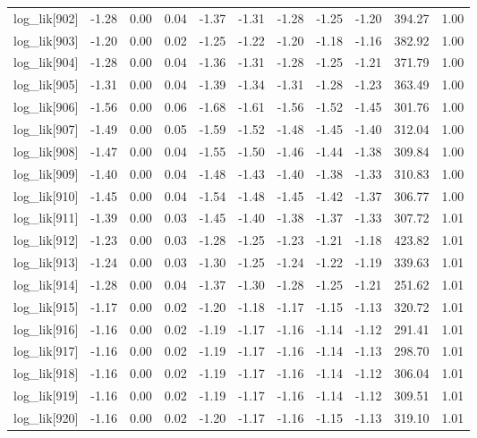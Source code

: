 \begin{table}[ht]
\begin{tabular}{rrrrrrrrrrr}
  log\_lik[902] & -1.28 & 0.00 & 0.04 & -1.37 & -1.31 & -1.28 & -1.25 & -1.20 & 394.27 & 1.00 \\ 
  log\_lik[903] & -1.20 & 0.00 & 0.02 & -1.25 & -1.22 & -1.20 & -1.18 & -1.16 & 382.92 & 1.00 \\ 
  log\_lik[904] & -1.28 & 0.00 & 0.04 & -1.36 & -1.31 & -1.28 & -1.25 & -1.21 & 371.79 & 1.00 \\ 
  log\_lik[905] & -1.31 & 0.00 & 0.04 & -1.39 & -1.34 & -1.31 & -1.28 & -1.23 & 363.49 & 1.00 \\ 
  log\_lik[906] & -1.56 & 0.00 & 0.06 & -1.68 & -1.61 & -1.56 & -1.52 & -1.45 & 301.76 & 1.00 \\ 
  log\_lik[907] & -1.49 & 0.00 & 0.05 & -1.59 & -1.52 & -1.48 & -1.45 & -1.40 & 312.04 & 1.00 \\ 
  log\_lik[908] & -1.47 & 0.00 & 0.04 & -1.55 & -1.50 & -1.46 & -1.44 & -1.38 & 309.84 & 1.00 \\ 
  log\_lik[909] & -1.40 & 0.00 & 0.04 & -1.48 & -1.43 & -1.40 & -1.38 & -1.33 & 310.83 & 1.00 \\ 
  log\_lik[910] & -1.45 & 0.00 & 0.04 & -1.54 & -1.48 & -1.45 & -1.42 & -1.37 & 306.77 & 1.00 \\ 
  log\_lik[911] & -1.39 & 0.00 & 0.03 & -1.45 & -1.40 & -1.38 & -1.37 & -1.33 & 307.72 & 1.01 \\ 
  log\_lik[912] & -1.23 & 0.00 & 0.03 & -1.28 & -1.25 & -1.23 & -1.21 & -1.18 & 423.82 & 1.01 \\ 
  log\_lik[913] & -1.24 & 0.00 & 0.03 & -1.30 & -1.25 & -1.24 & -1.22 & -1.19 & 339.63 & 1.01 \\ 
  log\_lik[914] & -1.28 & 0.00 & 0.04 & -1.37 & -1.30 & -1.28 & -1.25 & -1.21 & 251.62 & 1.01 \\ 
  log\_lik[915] & -1.17 & 0.00 & 0.02 & -1.20 & -1.18 & -1.17 & -1.15 & -1.13 & 320.72 & 1.01 \\ 
  log\_lik[916] & -1.16 & 0.00 & 0.02 & -1.19 & -1.17 & -1.16 & -1.14 & -1.12 & 291.41 & 1.01 \\ 
  log\_lik[917] & -1.16 & 0.00 & 0.02 & -1.19 & -1.17 & -1.16 & -1.14 & -1.13 & 298.70 & 1.01 \\ 
  log\_lik[918] & -1.16 & 0.00 & 0.02 & -1.19 & -1.17 & -1.16 & -1.14 & -1.12 & 306.04 & 1.01 \\ 
  log\_lik[919] & -1.16 & 0.00 & 0.02 & -1.19 & -1.17 & -1.16 & -1.14 & -1.12 & 309.51 & 1.01 \\ 
  log\_lik[920] & -1.16 & 0.00 & 0.02 & -1.20 & -1.17 & -1.16 & -1.15 & -1.13 & 319.10 & 1.01 \\ 

\end{tabular}
\end{table}
